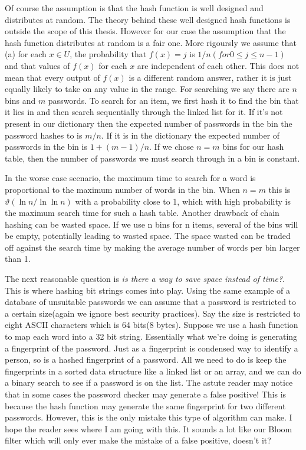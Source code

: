 \documentclass[MScCS]{uccthesis}
\begin{document}
Of course the assumption is that the hash function is well designed and distributes at random. The theory behind these well designed hash functions is outside the scope of this thesis. However for our case the assumption that the hash function distributes at random is a fair one. More rigoursly we assume that (a) for each $x \in U$, the probability  that $f(x)= j$ is $ 1 / n  (for 0 \leq j \leq n -1)$ and that values of $f(x)$ for each $x$ are independent of each other. This does not mean that every output of $f(x)$ is a different random answer, rather it is just equally likely to take on any value in the range. For searching we say there are $n$ bins and $m$ passwords. To search for an item, we first hash it to find the bin that it lies in and then search sequentially through
the linked list for it. If it's not present in our dictionary then the expected number of passwords in the bin the password hashes to is $m/n$. If it is in the dictionary the expected number of passwords in the bin is $1 + (m - 1)/n$. If we chose $n = m$ bins for our hash table, then the number of passwords we must search through in a bin is constant.

In the worse case scenario, the maximum time to search for a word is proportional to the maximum number of words in the bin. When $n = m $ this is $ \vartheta(\ln n / \ln \ln n)$ with a probability close to 1, which with high probability is the maximum search time for such a hash table. Another drawback of chain hashing can be wasted space. If we use n bins for n items, several of the bins will be empty, potentially leading to wasted space. The space wasted can be traded off against the search time by making the average number of words per bin larger than 1.

The next reasonable question is \textit{is there a way to save space instead of time?}. This is where hashing bit strings comes into play. Using the same example of a database of unsuitable passwords we can assume that a password is restricted to a certain size(again we ignore best security practices). Say the size is restricted to eight ASCII characters which is 64 bits(8 bytes). Suppose we use a hash function to map each word into a 32 bit string. Essentially what we're doing is generating a fingerprint of the password. Just as a fingerprint is condensed way to identify a person, so is a hashed fingerprint of a password. All we need to do is keep the fingerprints in a sorted data structure like a linked list or an array, and we can do a binary search to see if a password is on the list. The astute reader may notice that in some cases the password checker may generate a false positive! This is because the hash function may generate the same fingerprint for two different passwords. However, this is the only mistake this type of algorithm can make. I hope the reader sees where I am going with this. It sounds a lot like our Bloom filter which will only ever make the mistake of a false positive, doesn't it?
\end{document}
